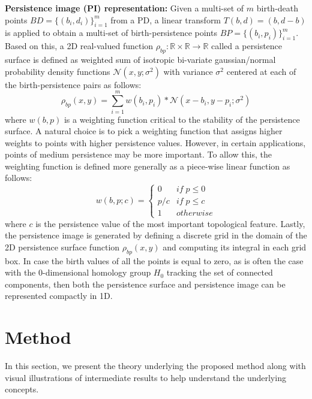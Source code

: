 \documentclass{article}
\begin{document}
\smallskip
\noindent \textbf{Persistence image (PI) representation:} Given a multi-set of $m$ birth-death points $BD=\{(b_i, d_i)\}_{i=1}^{m}$ from a PD, a linear transform $T(b, d) = (b, d-b)$ is applied to obtain a multi-set of birth-persistence points $BP=\{(b_i, p_i)\}_{i=1}^{m}$. Based on this, a 2D real-valued function $\rho_{bp} : \mathbb{R} \times \mathbb{R} \to \mathbb{R}$ called a persistence surface is defined as weighted sum of isotropic bi-variate gaussian/normal probability density functions $\mathcal{N}\left(x, y; \sigma^2\right)$ with variance $\sigma^2$ centered at each of the birth-persistence pairs as follows:
\begin{equation}
\rho_{bp}(x, y) = \sum_{i=1}^{m} w(b_i,p_i) * \mathcal{N}\left(x - b_i, y - p_i; \sigma^{2}\right)
\end{equation}
where $w(b, p)$ is a weighting function critical to the stability of the persistence surface. A natural choice is to pick a weighting function that assigns higher weights to points with higher persistence values. However, in certain applications, points of medium persistence may be more important. To allow this, the weighting function is defined more generally as a piece-wise linear function as follows:
\begin{equation}
w(b, p; c) = \left\{\begin{array}{ll}
 0 & if \; p \leq 0\\ 
 p / c & if \; p \leq c\\ 
 1 & otherwise
\end{array}\right.    
\end{equation}
where $c$ is the persistence value of the most important topological feature. Lastly, the persistence image is generated by defining a discrete grid in the domain of the 2D persistence surface function $\rho_{bp}(x, y)$ and computing its integral in each grid box. In case the birth values of all the points is equal to zero, as is often the case with the 0-dimensional homology group $H_0$ tracking the set of connected components, then both the persistence surface and persistence image can be represented compactly in 1D.  

\section{Method}
\label{sec:method}
In this section, we present the theory underlying the proposed method along with visual illustrations of intermediate results to help understand the underlying concepts. 
\end{document}
